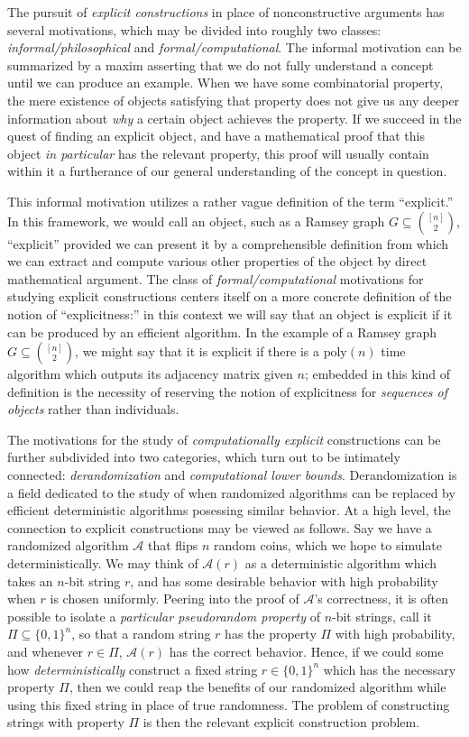 \documentclass[11pt]{article}
\newcommand{\B}{\{0,1\}}
\newcommand{\poly}{\mathrm{poly}}
\begin{document}
The pursuit of \emph{explicit constructions} in place of nonconstructive arguments has several motivations, which may be divided into roughly two classes: \emph{informal/philosophical} and \emph{formal/computational}. The informal motivation can be summarized by a maxim asserting that we do not fully understand a concept until we can produce an example. When we have some combinatorial property, the mere existence of objects satisfying that property does not give us any deeper information about \emph{why} a certain object achieves the property. If we succeed in the quest of finding an explicit object, and have a mathematical proof that this object \emph{in particular} has the relevant property, this proof will usually contain within it a furtherance of our general understanding of the concept in question.

This informal motivation utilizes a rather vague definition of the term ``explicit.'' In this framework, we would call an object, such as a Ramsey graph $G \subseteq \binom{[n]}{2}$, ``explicit'' provided we can present it by a comprehensible definition from which we can extract and compute various other properties of the object by direct mathematical argument. The class of \emph{formal/computational} motivations for studying explicit constructions centers itself on a more concrete definition of the notion of ``explicitness:'' in this context we will say that an object is explicit if it can be produced by an efficient algorithm. In the example of a Ramsey graph $G \subseteq \binom{[n]}{2}$, we might say that it is explicit if there is a $\poly(n)$ time algorithm which outputs its adjacency matrix given $n$; embedded in this kind of definition is the necessity of reserving the notion of explicitness for \emph{sequences of objects} rather than individuals. 

The motivations for the study of \emph{computationally explicit} constructions can be further subdivided into two categories, which turn out to be intimately connected: \emph{derandomization} and \emph{computational lower bounds}. Derandomization is a field dedicated to the study of when randomized algorithms can be replaced by efficient deterministic algorithms posessing similar behavior. At a high level, the connection to explicit constructions may be viewed as follows. Say we have a randomized algorithm $\mathcal{A}$ that flips $n$ random coins, which we hope to simulate deterministically. We may think of $\mathcal{A}(r)$ as a deterministic algorithm which takes an $n$-bit string $r$, and has some desirable behavior with high probability when $r$ is chosen uniformly. Peering into the proof of $\mathcal{A}$'s correctness, it is often possible to isolate a \emph{particular pseudorandom property} of $n$-bit strings, call it $\Pi \subseteq \B^n$, so that a random string $r$ has the property $\Pi$ with high probability, and whenever $r \in \Pi$, $\mathcal{A}(r)$ has the correct behavior. Hence, if we could some how \emph{deterministically} construct a fixed string $r \in \B^n$ which has the necessary property $\Pi$, then we could reap the benefits of our randomized algorithm while using this fixed string in place of true randomness. The problem of constructing strings with property $\Pi$ is then the relevant explicit construction problem.
\end{document}

